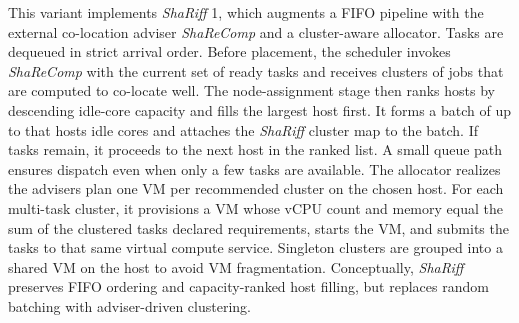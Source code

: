 This variant implements \textit{ShaRiff} 1, which augments a FIFO pipeline with the external co-location adviser \textit{ShaReComp} and a cluster-aware allocator. Tasks are dequeued in strict arrival order. Before placement, the scheduler invokes \textit{ShaReComp} with the current set of ready tasks and receives clusters of jobs that are computed to co-locate well. The node-assignment stage then ranks hosts by descending idle-core capacity and fills the largest host first. It forms a batch of up to that hosts idle cores and attaches the \textit{ShaRiff} cluster map to the batch. If tasks remain, it proceeds to the next host in the ranked list. A small queue path ensures dispatch even when only a few tasks are available.
The allocator realizes the advisers plan one VM per recommended cluster on the chosen host. For each multi-task cluster, it provisions a VM whose vCPU count and memory equal the sum of the clustered tasks declared requirements, starts the VM, and submits the tasks to that same virtual compute service. Singleton clusters are grouped into a shared VM on the host to avoid VM fragmentation.
Conceptually, \textit{ShaRiff} preserves FIFO ordering and capacity-ranked host filling, but replaces random batching with adviser-driven clustering.

